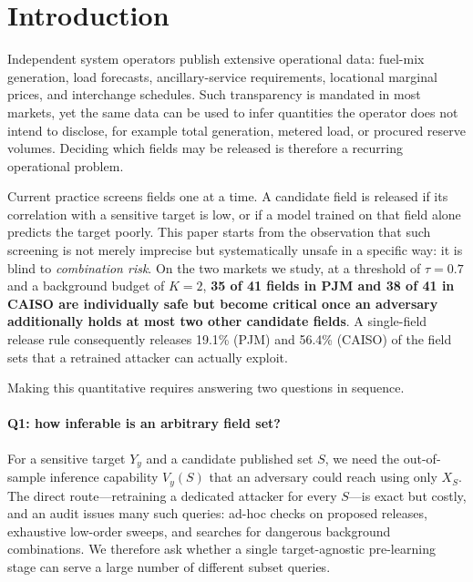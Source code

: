 \documentclass[preprint,12pt]{elsarticle}
\newcommand{\Vy}{V_{y}}
\begin{document}
\section{Introduction}

Independent system operators publish extensive operational data: fuel-mix generation,
load forecasts, ancillary-service requirements, locational marginal prices, and interchange
schedules. Such transparency is mandated in most markets, yet the same data can be used to
infer quantities the operator does not intend to disclose, for example total generation,
metered load, or procured reserve volumes. Deciding which fields may be released is
therefore a recurring operational problem.

Current practice screens fields one at a time. A candidate field is released if its
correlation with a sensitive target is low, or if a model trained on that field alone
predicts the target poorly. This paper starts from the observation that such screening is
not merely imprecise but systematically unsafe in a specific way: it is blind to
\emph{combination risk}. On the two markets we study, at a threshold of $\tau=0.7$ and a
background budget of $K=2$, \textbf{35 of 41 fields in PJM and 38 of 41 in CAISO are
individually safe but become critical once an adversary additionally holds at most two
other candidate fields}. A single-field release rule consequently releases 19.1\% (PJM) and
56.4\% (CAISO) of the field sets that a retrained attacker can actually exploit.

Making this quantitative requires answering two questions in sequence.

\paragraph{Q1: how inferable is an arbitrary field set?}
For a sensitive target $Y_y$ and a candidate published set $S$, we need the out-of-sample
inference capability $\Vy(S)$ that an adversary could reach using only $X_S$. The direct
route---retraining a dedicated attacker for every $S$---is exact but costly, and an audit
issues many such queries: ad-hoc checks on proposed releases, exhaustive low-order sweeps,
and searches for dangerous background combinations. We therefore ask whether a single
target-agnostic pre-learning stage can serve a large number of different subset queries.
\end{document}
